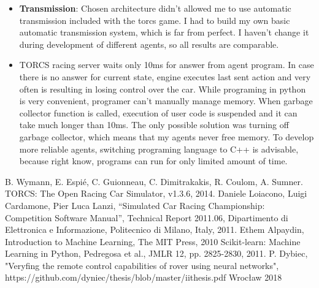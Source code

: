\documentclass[declaration,shortabstract,english,inz]{iithesis}
\begin{document}
\begin{itemize}
    \item \textbf{Transmission}: Chosen architecture didn't allowed me to use automatic transmission included with the torcs game.
I had to build my own basic automatic transmission system, which is far from perfect.
I haven't change it during development of different agents, so all results are comparable.

    \item TORCS racing server waits only 10ms for answer from agent program.
In case there is no answer for current state, engine executes last sent action and very often is resulting in losing control over the car.
While programing in python is very convenient, programer can't manually manage memory.
When garbage collector function is called, execution of user code is suspended and it can take much longer than 10ms.
The only possible solution was turning off garbage collector, which means that my agents never free memory.
To develop more reliable agents, switching programing language to C++ is advisable, because right know, programs can run for only limited amount of time.
\end{itemize}



\begin{thebibliography}{1}
 B. Wymann, E. Espié, C. Guionneau, C. Dimitrakakis, R. Coulom, A. Sumner. TORCS: The Open Racing Car Simulator, v1.3.6, 2014.
 Daniele Loiacono, Luigi Cardamone, Pier Luca Lanzi, “Simulated Car
Racing Championship: Competition Software Manual”, Technical Report 2011.06, Dipartimento
di Elettronica e Informazione, Politecnico di Milano, Italy, 2011.
 Ethem Alpaydin, Introduction to Machine Learning, The MIT Press, 2010
 Scikit-learn: Machine Learning in Python, Pedregosa et al., JMLR 12, pp. 2825-2830, 2011.
 P. Dybiec, "Veryfing the remote control capabilities of rover using neural networks", https://github.com/dyniec/thesis/blob/master/iithesis.pdf Wrocław 2018

\end{thebibliography}
\end{document}
